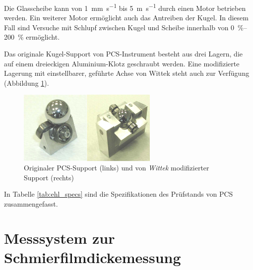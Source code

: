 Die Glasscheibe kann von \SI[per-mode=symbol]{1}{\milli\meter\per\second} bis \SI[per-mode=symbol]{5}{\meter\per\second} durch einen Motor betrieben werden.
Ein weiterer Motor ermöglicht auch das Antreiben der Kugel.
In diesem Fall sind Versuche mit Schlupf zwischen Kugel und Scheibe innerhalb von \SIrange{0}{200}{\percent} ermöglicht.

Das originale Kugel-Support von PCS-Instrument besteht aus drei Lagern, die auf einem dreieckigen Aluminium-Klotz geschraubt werden.
Eine modifizierte Lagerung mit einstellbarer, geführte Achse von Wittek \cite{wittek_2007} steht auch zur Verfügung (Abbildung \ref{fig:kugel_support}).
\begin{figure}[htb]
    \centering
    \includegraphics[width=0.6\textwidth]{./images/kugel-support_original_und_wittek.jpg}
    \caption{Originaler PCS-Support (links) und von \textit{Wittek} modifizierter Support (rechts) \cite{wittek_2007}}
    \label{fig:kugel_support}
\end{figure}
%

In Tabelle \ref{tab:ehl_specs} sind die Spezifikationen des Prüfstands von PCS zusammengefasst.

\section{Messsystem zur Schmierfilmdickemessung}
\label{sec:messsystem_zur_schmierfilmdickemessung}

